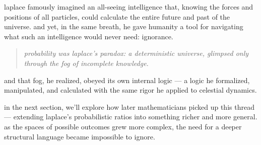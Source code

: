 laplace famously imagined an all-seeing intelligence that, knowing the forces and positions of all particles, could calculate the entire future and past of the universe. and yet, in the same breath, he gave humanity a tool for navigating what such an intelligence would never need: ignorance.

\begin{quote}
    \textit{probability was laplace’s paradox: a deterministic universe, glimpsed only through the fog of incomplete knowledge.}
\end{quote}

and that fog, he realized, obeyed its own internal logic — a logic he formalized, manipulated, and calculated with the same rigor he applied to celestial dynamics.

\vspace{1em}
\noindent
in the next section, we’ll explore how later mathematicians picked up this thread — extending laplace’s probabilistic ratios into something richer and more general. as the spaces of possible outcomes grew more complex, the need for a deeper structural language became impossible to ignore.

